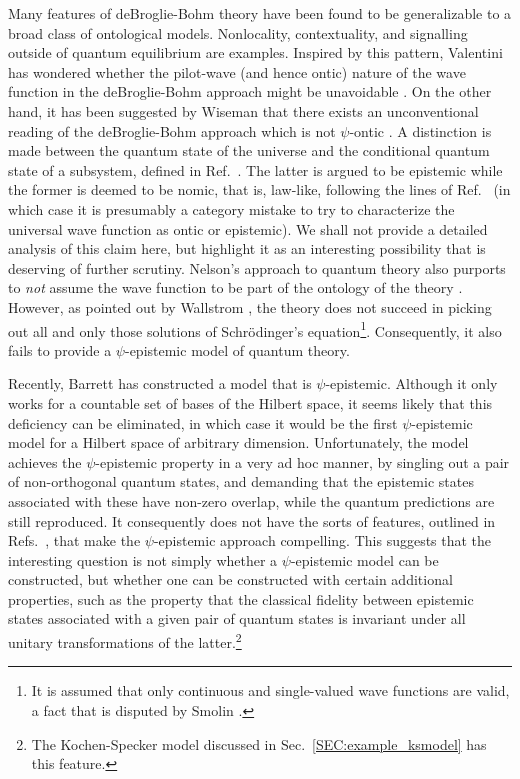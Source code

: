 \documentclass[aps,nofootinbib,12pt]{revtex4}
\begin{document}
Many features of deBroglie-Bohm theory have been found to be
generalizable to a broad class of ontological models. Nonlocality,
contextuality, and signalling outside of quantum equilibrium
\cite{valentini} are examples. Inspired by this pattern, Valentini
has wondered whether the pilot-wave (and hence ontic) nature of the
wave function in the deBroglie-Bohm approach might be unavoidable
\cite{Valentiniprivate}. On the other hand, it has been suggested by
Wiseman that there exists an unconventional reading of the
deBroglie-Bohm approach which is not $\psi$-ontic
\cite{Wisemanprivate}. A distinction is made between the quantum
state of the universe and the conditional quantum state of a
subsystem, defined in Ref.~\cite{DGZ_conditionalqstate}. The latter
is argued to be epistemic while the former is deemed to be nomic,
that is, law-like, following the lines of
Ref.~\cite{DurrGoldteinZanghi} (in which case it is presumably a
category mistake to try to characterize the universal wave function
as ontic or epistemic). We shall not provide a detailed analysis of
this claim here, but highlight it as an interesting possibility that
is deserving of further scrutiny. Nelson's approach to quantum
theory \cite{Nelsonbook} also purports to \textit{not} assume the
wave function to be part of the ontology of the theory
\cite{BacconNelson}. However, as pointed out by Wallstrom
\cite{Wallstrom}, the theory does not succeed in picking out all and
only those solutions of Schr\"{o}dinger's equation\footnote{It is
assumed that only continuous and single-valued wave functions are
valid, a fact that is disputed by Smolin \cite{Smolin_Nelson}.}.
Consequently, it also fails to provide a $\psi$-epistemic model of
quantum theory.

Recently, Barrett \cite{Barrettpc} has constructed a model that is
$\psi$-epistemic.  Although it only works for a countable set of
bases of the Hilbert space, it seems likely that this deficiency can
be eliminated, in which case it would be the first $\psi$-epistemic
model for a Hilbert space of arbitrary dimension. Unfortunately, the
model achieves the $\psi$-epistemic property in a very ad hoc
manner, by singling out a pair of non-orthogonal quantum states, and
demanding that the epistemic states associated with these have
non-zero overlap, while the quantum predictions are still
reproduced.  It consequently does not have the sorts of features,
outlined in Refs.~\cite{toy_theory,BRSLiouville}, that make the
$\psi$-epistemic approach compelling.  This suggests that the
interesting question is not simply whether a $\psi$-epistemic model
can be constructed, but whether one can be constructed with certain
additional properties, such as the property that the classical
fidelity between epistemic states associated with a given pair of
quantum states is invariant under all unitary transformations of the
latter.\footnote{The Kochen-Specker model discussed in
Sec.~\ref{SEC:example_ksmodel} has this feature.}
\end{document}
